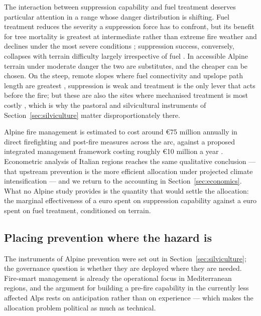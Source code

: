 \documentclass[11pt,a4paper]{article}
\begin{document}
The interaction between suppression capability and fuel treatment deserves particular attention in a range whose danger distribution is shifting. Fuel treatment reduces the severity a suppression force has to confront, but its benefit for tree mortality is greatest at intermediate rather than extreme fire weather and declines under the most severe conditions \citep{brodie_forest_2024}; suppression success, conversely, collapses with terrain difficulty largely irrespective of fuel \citep{cardil_assessing_2025}. In accessible Alpine terrain under moderate danger the two are substitutes, and the cheaper can be chosen. On the steep, remote slopes where fuel connectivity and upslope path length are greatest \citep{conedera_linking_2024}, suppression is weak and treatment is the only lever that acts before the fire; but these are also the sites where mechanised treatment is most costly \citep{dinca_timber_2025}, which is why the pastoral and silvicultural instruments of Section~\ref{sec:silviculture} matter disproportionately there.

Alpine fire management is estimated to cost around €75 million annually in direct firefighting and post-fire measures across the arc, against a proposed integrated management framework costing roughly €10 million a year \citep{muller_forest_2020}. Econometric analysis of Italian regions reaches the same qualitative conclusion --- that upstream prevention is the more efficient allocation under projected climate intensification \citep{michetti_forest_2019} --- and we return to the accounting in Section~\ref{sec:economics}. What no Alpine study provides is the quantity that would settle the allocation: the marginal effectiveness of a euro spent on suppression capability against a euro spent on fuel treatment, conditioned on terrain.

\subsection{Placing prevention where the hazard is}

The instruments of Alpine prevention were set out in Section~\ref{sec:silviculture}; the governance question is whether they are deployed where they are needed. Fire-smart management is already the operational focus in Mediterranean regions, and the argument for building a pre-fire capability in the currently less affected Alps rests on anticipation rather than on experience \citep{gerberding_mapping_2025} --- which makes the allocation problem political as much as technical.
\end{document}
